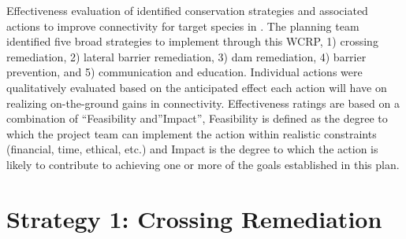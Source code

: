 \documentclass[
  letterpaper,
  DIV=11,
  numbers=noendperiod]{scrreprt}
\begin{document}
Effectiveness evaluation of identified conservation strategies and
associated actions to improve connectivity for target species in . The
planning team identified five broad strategies to implement through this
WCRP, 1) crossing remediation, 2) lateral barrier remediation, 3) dam
remediation, 4) barrier prevention, and 5) communication and education.
Individual actions were qualitatively evaluated based on the anticipated
effect each action will have on realizing on-the-ground gains in
connectivity. Effectiveness ratings are based on a combination of
``Feasibility and''Impact'', Feasibility is defined as the degree to
which the project team can implement the action within realistic
constraints (financial, time, ethical, etc.) and Impact is the degree to
which the action is likely to contribute to achieving one or more of the
goals established in this plan.

\section*{Strategy 1: Crossing
Remediation}\label{strategy-1-crossing-remediation}

\end{document}
